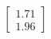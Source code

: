\documentclass[preview]{standalone}
\begin{document}
\begin{align*}
\begin{bmatrix} 1.71 \\ 1.96 \end{bmatrix}
\end{align*}
\end{document}
